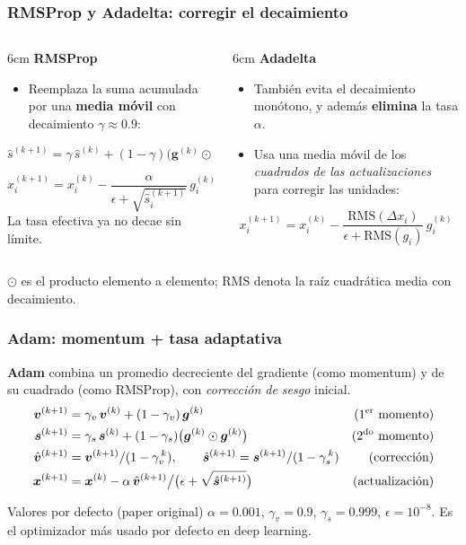 \documentclass[aspectratio=169, 10pt]{beamer}
\newcommand{\gv}{\bm{g}}
\newcommand{\xv}{\bm{x}}
\newcommand{\vv}{\bm{v}}
\newcommand{\sv}{\bm{s}}
\newcommand{\formula}[1]{%
	\begin{tcolorbox}[colback=UCMBlue!8, colframe=UCMBlue, arc=4pt,
		boxsep=2pt, left=6pt, right=6pt, top=3pt, bottom=3pt]
		#1
	\end{tcolorbox}
}
\begin{document}
\begin{frame}
\frametitle{RMSProp y Adadelta: corregir el decaimiento}
\begin{columns}[T]
\begin{column}{6cm}
\textbf{RMSProp}
\begin{itemize}
	\item Reemplaza la suma acumulada por una \textbf{media m\'ovil} con decaimiento $\gamma\approx 0.9$:
\end{itemize}
\formula{\[
\hat{s}^{(k+1)} = \gamma\,\hat{s}^{(k)} + (1-\gamma)\big(\gv^{(k)}\odot\gv^{(k)}\big)
\]}
\[ x_i^{(k+1)} = x_i^{(k)} - \frac{\alpha}{\epsilon+\sqrt{\hat{s}_i^{(k+1)}}}\,g_i^{(k)} \]
La tasa efectiva ya no decae sin l\'imite.
\end{column}
\begin{column}{6cm}
\textbf{Adadelta}
\begin{itemize}
	\item Tambi\'en evita el decaimiento mon\'otono, y adem\'as \textbf{elimina} la tasa $\alpha$.
	\item Usa una media m\'ovil de los \emph{cuadrados de las actualizaciones} para corregir las unidades:
\end{itemize}
\formula{\[
x_i^{(k+1)} = x_i^{(k)} - \frac{\mathrm{RMS}(\Delta x_i)}{\epsilon+\mathrm{RMS}(g_i)}\,g_i^{(k)}
\]}
\end{column}
\end{columns}
\vspace{0.5em}
\footnotesize $\odot$ es el producto elemento a elemento; $\mathrm{RMS}$ denota la ra\'iz cuadr\'atica media con decaimiento.
\end{frame}

\begin{frame}
\frametitle{Adam: momentum + tasa adaptativa}
\textbf{Adam} combina un promedio decreciente del gradiente (como momentum) y de su cuadrado (como RMSProp), con \emph{correcci\'on de sesgo} inicial.
\begin{align*}
\vv^{(k+1)} &= \gamma_v\,\vv^{(k)} + (1-\gamma_v)\,\gv^{(k)} & \text{(1\textsuperscript{er} momento)}\\
\sv^{(k+1)} &= \gamma_s\,\sv^{(k)} + (1-\gamma_s)\big(\gv^{(k)}\odot\gv^{(k)}\big) & \text{(2\textsuperscript{do} momento)}\\
\hat{\vv}^{(k+1)} &= \vv^{(k+1)}/(1-\gamma_v^{\,k}), \qquad
\hat{\sv}^{(k+1)} = \sv^{(k+1)}/(1-\gamma_s^{\,k}) & \text{(correcci\'on)}\\
\xv^{(k+1)} &= \xv^{(k)} - \alpha\,\hat{\vv}^{(k+1)} \big/ \big(\epsilon + \sqrt{\hat{\sv}^{(k+1)}}\big) & \text{(actualizaci\'on)}
\end{align*}
\pause
\begin{block}{Valores por defecto (paper original)}
$\alpha=0.001$, \quad $\gamma_v=0.9$, \quad $\gamma_s=0.999$, \quad $\epsilon=10^{-8}$. Es el optimizador m\'as usado por defecto en deep learning.
\end{block}
\end{frame}
\end{document}
